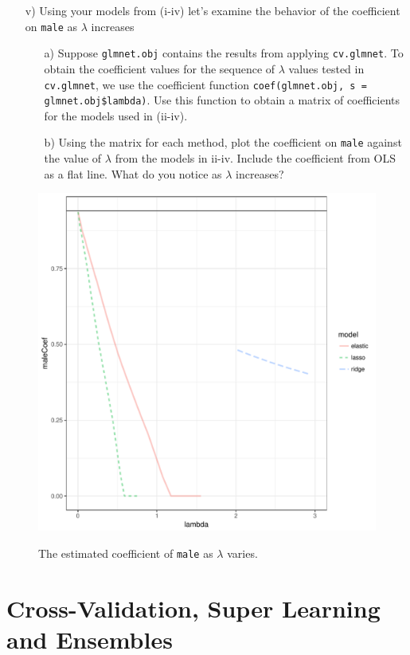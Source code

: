 \documentclass[12pt,letterpaper]{article}
\begin{document}
\begin{itemize}
\item[v)] Using your models from (i-iv) let's examine the behavior of the coefficient on {\tt male} as $\lambda$ increases
\begin{itemize}
\item[a)] Suppose {\tt glmnet.obj} contains the results from applying {\tt cv.glmnet}.  To obtain the coefficient values for the sequence of $\lambda$ values tested in {\tt cv.glmnet}, we use the coefficient function {\tt coef(glmnet.obj, s = glmnet.obj\$lambda)}.  Use this function to obtain a matrix of coefficients for the models used in (ii-iv).
\item[b)] Using the matrix for each method, plot the coefficient on {\tt male} against the value of $\lambda$ from the models in ii-iv.  Include the coefficient from OLS as a flat line.  What do you notice as $\lambda$ increases?
\end{itemize}
\end{itemize}

  

\begin{figure}[H]
  \caption{\footnotesize{The estimated coefficient of {\tt male} as $\lambda$ varies.}}
  \centering
   \includegraphics[width=.7\linewidth]{HW4lambda.pdf}\\
\end{figure}
  
\section{Cross-Validation, Super Learning and Ensembles}
\end{document}
